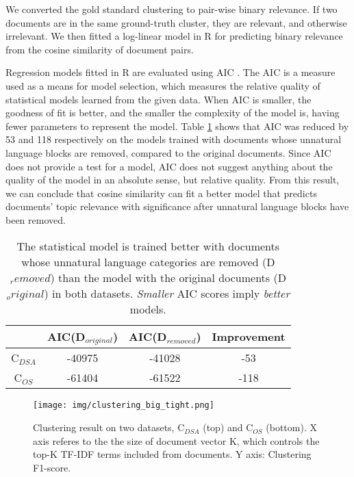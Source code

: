 \documentclass[11pt,letterpaper]{article}
\begin{document}
We converted the gold standard clustering to pair-wise binary relevance. If two documents are in the same ground-truth cluster, they are relevant, and otherwise irrelevant. We then fitted a log-linear model in R for predicting binary relevance from the cosine similarity of document pairs. 

Regression models fitted in R are evaluated using AIC \cite{akaike1974}. The AIC is a measure used as a means for model selection, which measures the relative quality of statistical models learned from the given data. When AIC is smaller, the goodness of fit is better, and the smaller the complexity of the model is, having fewer parameters to represent the model. Table \ref{tab:regression} shows that AIC was reduced by 53 and 118 respectively on the models trained with documents whose unnatural language blocks are removed, compared to the original documents. Since AIC does not provide a test for a model, AIC does not suggest anything about the quality of the model in an absolute sense, but relative quality. From this result, we can conclude that cosine similarity can fit a better model that predicts documents' topic relevance with significance after unnatural language blocks have been removed. 

\begin{table}[h]
\centering
\small
\begin{tabular}{c|c|c|c}

    & AIC(D$_{original}$) & AIC(D$_{removed}$) & Improvement \\ \hline
C$_{DSA}$ &   -40975   &     -41028    & -53             \\
C$_{OS}$  &    -61404  & -61522    & -118           
\end{tabular}
\caption{
The statistical model is trained better with documents whose unnatural language categories are removed (D$_removed$) than the model with the original documents (D$_original$) in both datasets.  \emph{Smaller} AIC scores imply \emph{better} models.}
\label{tab:regression}
\end{table}

\begin{figure}[t]
\centering
\texttt{[image: img/clustering\_big\_tight.png]}
\caption{Clustering result on two datasets, C$_{DSA}$ (top) and C$_{OS}$ (bottom). X axis referes to the the size of document vector K, which controls the top-K TF-IDF terms included from documents. Y axis: Clustering F1-score. }
\label{figure:clustering}
\end{figure}
\end{document}
